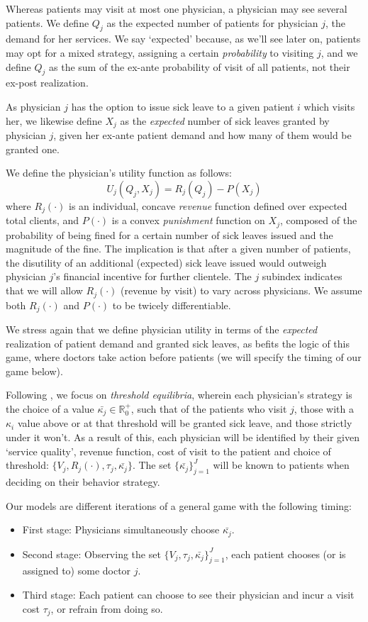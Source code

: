 \documentclass[../main.tex]{subfiles}
\begin{document}
Whereas patients may visit at most one physician, a physician may see several patients. We define $Q_j$ as the expected number of patients for physician $j$, the demand for her services. We say `expected' because, as we'll see later on, patients may opt for a mixed strategy, assigning a certain \textit{probability} to visiting $j$, and we define $Q_j$ as the sum of the ex-ante probability of visit of all patients, not their ex-post realization.

As physician $j$ has the option to issue sick leave to a given patient $i$ which visits her, we likewise define $X_j$ as the \textit{expected} number of sick leaves granted by physician $j$, given her ex-ante patient demand and how many of them would be granted one.

We define the physician's utility function as follows:
\[
U_j(Q_j, X_j) = R_j(Q_j) - P(X_j)
\]
where $R_j(\cdot)$ is an individual, concave \textit{revenue} function defined over expected total clients, and $P(\cdot)$ is a convex \textit{punishment} function on $X_j$, composed of the probability of being fined for a certain number of sick leaves issued and the magnitude of the fine. The implication is that after a given number of patients, the disutility of an additional (expected) sick leave issued would outweigh physician $j$'s financial incentive for further clientele. The $j$ subindex indicates that we will allow $R_j(\cdot)$ (revenue by visit) to vary across physicians. We assume both $R_j(\cdot)$ and $P(\cdot)$ to be twicely differentiable.

We stress again that we define physician utility in terms of the \textit{expected} realization of patient demand and granted sick leaves, as befits the logic of this game, where doctors take action before patients (we will specify the timing of our game below).

Following \cite{schnell2017physician}, we focus on \textit{threshold equilibria}, wherein each physician's strategy is the choice of a value $\bar{\kappa_j} \in \mathbb{R}_0^+$, such that of the patients who visit $j$, those with a $\kappa_i$ value above or at that threshold will be granted sick leave, and those strictly under it won't. As a result of this, each physician will be identified by their given `service quality', revenue function, cost of visit to the patient and choice of threshold: $\{V_j,R_j(\cdot), \tau_j, \bar{\kappa_j}\}$. The set $\{\bar{\kappa_j}\}_{j=1}^{J}$ will be known to patients when deciding on their behavior strategy.

Our models are different iterations of a general game with the following timing:
\begin{itemize}[itemsep=-1pt, topsep=0pt]
    \item First stage: Physicians simultaneously choose $\bar{\kappa_j}$.
    \item Second stage: Observing the set $\{V_j, \tau_j, \bar{\kappa_j}\}_{j=1}^{J}$, each patient chooses (or is assigned to) some doctor $j$.
    \item Third stage: Each patient can choose to see their physician and incur a visit cost $\tau_j$, or refrain from doing so.
\end{itemize}
\end{document}
